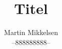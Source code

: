 \documentclass[a4paper,oneside]{memoir}
\begin{document}
	
	\author{Martin Mikkelsen  \\ 
		--888888888-- \\ }
	\title{Titel}
	\maketitle
	
	
	
	\thispagestyle{firststyle}
	
	\lipsum[0-1]	
	
	
\end{document}
